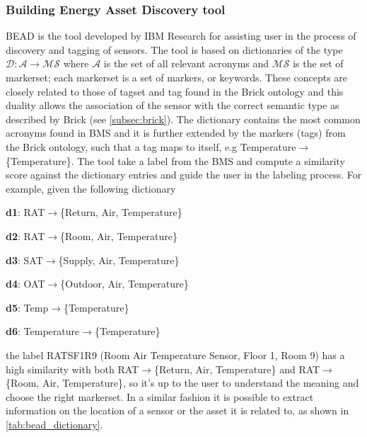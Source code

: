 \subsubsection{Building Energy Asset Discovery tool}
BEAD \cite{bead} is the tool developed by IBM Research for assisting user in the process of discovery and tagging of sensors. The tool is based on dictionaries of the type $\mathcal{D}:\mathcal{A}\rightarrow \mathcal{MS}$ where $\mathcal{A}$ is the set of all relevant acronyms and $\mathcal{MS}$ is the set of markerset; each markerset is a set of markers, or keywords. These concepts are closely related to those of tagset and tag found in the Brick ontology and this duality allows the association of the sensor with the correct semantic type as described by Brick (see \ref{subsec:brick}). The dictionary contains the most common acronyms found in BMS and it is further extended by the markers (tags) from the Brick ontology, such that a tag maps to itself, e.g Temperature$\rightarrow$\{Temperature\}. The tool take a label from the BMS and compute a similarity score against the dictionary entries and guide the user in the labeling process. For example, given the following dictionary
\begin{description}[noitemsep]
  \item \textbf{d1}: RAT$\rightarrow$\{Return, Air, Temperature\}
  \item \textbf{d2}: RAT$\rightarrow$\{Room, Air, Temperature\}
  \item \textbf{d3}: SAT$\rightarrow$\{Supply, Air, Temperature\}
  \item \textbf{d4}: OAT$\rightarrow$\{Outdoor, Air, Temperature\}
  \item \textbf{d5}: Temp$\rightarrow$\{Temperature\}
  \item \textbf{d6}: Temperature$\rightarrow$\{Temperature\}
\end{description}
the label RATSF1R9 (Room Air Temperature Sensor, Floor 1, Room 9) has a high similarity with both RAT$\rightarrow$\{Return, Air, Temperature\} and RAT$\rightarrow$\{Room, Air, Temperature\}, so it's up to the user to understand the meaning and choose the right markerset. In a similar fashion it is possible to extract information on the location of a sensor or the asset it is related to, as shown in \autoref{tab:bead_dictionary}.
